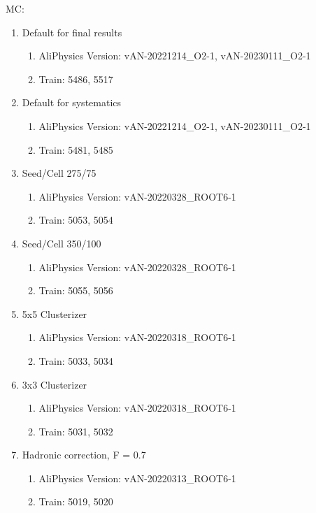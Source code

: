 \documentclass[ALICE]{ALICE_analysis_notes}
\begin{document}
\begin{appendix}
MC:
\begin{enumerate}
    \item Default for final results
    \begin{enumerate}
        \item AliPhysics Version: vAN-20221214\_O2-1, vAN-20230111\_O2-1
        \item Train: 5486, 5517
    \end{enumerate}
    \item Default for systematics
    \begin{enumerate}
        \item AliPhysics Version: vAN-20221214\_O2-1, vAN-20230111\_O2-1
        \item Train: 5481, 5485
    \end{enumerate}
    \item Seed/Cell 275/75
    \begin{enumerate}
        \item AliPhysics Version: vAN-20220328\_ROOT6-1
        \item Train: 5053, 5054
    \end{enumerate}
    \item Seed/Cell 350/100
    \begin{enumerate}
        \item AliPhysics Version: vAN-20220328\_ROOT6-1
        \item Train: 5055, 5056
    \end{enumerate}
    \item 5x5 Clusterizer
    \begin{enumerate}
        \item AliPhysics Version: vAN-20220318\_ROOT6-1
        \item Train: 5033, 5034
    \end{enumerate}
    \item 3x3 Clusterizer
    \begin{enumerate}
        \item AliPhysics Version: vAN-20220318\_ROOT6-1
        \item Train: 5031, 5032
    \end{enumerate}
    \item Hadronic correction, F = 0.7
    \begin{enumerate}
        \item AliPhysics Version: vAN-20220313\_ROOT6-1
        \item Train: 5019, 5020
    \end{enumerate}

\end{enumerate}
\end{appendix}
\end{document}
